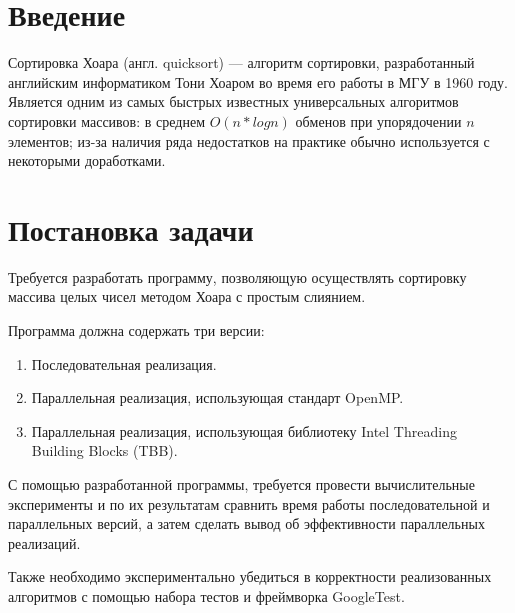 \documentclass{report}
\begin{document}
\setcounter{page}{2}

\tableofcontents
\newpage

\section*{Введение}
Сортировка Хоара (англ. quicksort) — алгоритм сортировки, разработанный английским информатиком Тони Хоаром во время его работы в МГУ в 1960 году. Является одним из самых быстрых известных универсальных алгоритмов сортировки массивов: в среднем $O(n*log{n})$ обменов при упорядочении $n$ элементов; из-за наличия ряда недостатков на практике обычно используется с некоторыми доработками.

\newpage

\section*{Постановка задачи}
Требуется разработать программу, позволяющую осуществлять сортировку массива целых чисел методом Хоара с простым слиянием.
\par Программа должна содержать три версии:
\begin{enumerate}
\item Последовательная реализация.
\item Параллельная реализация, использующая стандарт OpenMP.
\item Параллельная реализация, использующая библиотеку Intel Threading Building Blocks (TBB).
\end{enumerate}
\par С помощью разработанной программы, требуется провести вычислительные эксперименты и по их результатам сравнить время работы последовательной и параллельных версий, а затем сделать вывод об эффективности параллельных реализаций.
\par Также необходимо экспериментально убедиться в корректности реализованных алгоритмов с помощью набора тестов и фреймворка GoogleTest.
\newpage

\end{document}
